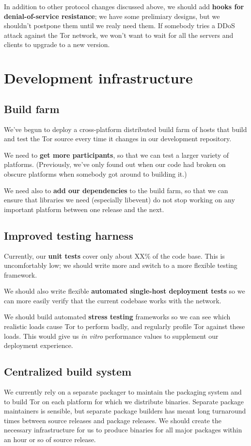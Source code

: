 \documentclass{article}
\begin{document}
In addition to other protocol changes discussed above,
we should add {\bf hooks for denial-of-service resistance}; we have some
prelimiary designs, but we shouldn't postpone them until we realy need them.
If somebody tries a DDoS attack against the Tor network, we won't want to
wait for all the servers and clients to upgrade to a new version.

\section{Development infrastructure}

\subsection{Build farm}
We've begun to deploy a cross-platform distributed build farm of hosts
that build and test the Tor source every time it changes in our development
repository.

We need to {\bf get more participants}, so that we can test a larger variety
of platforms.  (Previously, we've only found out when our code had broken on
obscure platforms when somebody got around to building it.)

We need also to {\bf add our dependencies} to the build farm, so that we can
ensure that libraries we need (especially libevent) do not stop working on
any important platform between one release and the next.

\subsection{Improved testing harness}
Currently, our {\bf unit tests} cover only about XX\% of the code base.  This
is uncomfortably low; we should write more and switch to a more flexible
testing framework.

We should also write flexible {\bf automated single-host deployment tests} so
we can more easily verify that the current codebase works with the network.

We should build automated {\bf stress testing} frameworks so we can see which
realistic loads cause Tor to perform badly, and regularly profile Tor against
these loads.  This would give us {\it in vitro} performance values to
supplement our deployment experience.

\subsection{Centralized build system}
We currently rely on a separate packager to maintain the packaging system and
to build Tor on each platform for which we distribute binaries.  Separate
package maintainers is sensible, but separate package builders has meant
long turnaround times between source releases and package releases.  We
should create the necessary infrastructure for us to produce binaries for all
major packages within an hour or so of source release.
\end{document}
